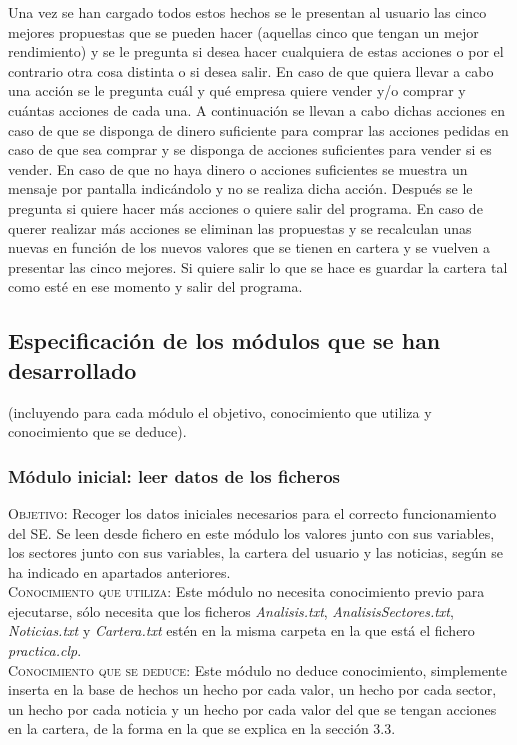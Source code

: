 \documentclass[12pt]{article}
\begin{document}
Una vez se han cargado todos estos hechos se le presentan al usuario las cinco mejores propuestas que se pueden hacer (aquellas cinco que tengan un mejor rendimiento) y se le pregunta si desea hacer cualquiera de estas acciones o por el contrario otra cosa distinta o si desea salir. En caso de que quiera llevar a cabo una acción se le pregunta cuál y qué empresa quiere vender y/o comprar y cuántas acciones de cada una. A continuación se llevan a cabo dichas acciones en caso de que se disponga de dinero suficiente para comprar las acciones pedidas en caso de que sea comprar y se disponga de acciones suficientes para vender si es vender. En caso de que no haya dinero o acciones suficientes se muestra un mensaje por pantalla indicándolo y no se realiza dicha acción. Después se le pregunta si quiere hacer más acciones o quiere salir del programa. En caso de querer realizar más acciones se eliminan las propuestas y se recalculan unas nuevas en función de los nuevos valores que se tienen en cartera y se vuelven a presentar las cinco mejores. Si quiere salir lo que se hace es guardar la cartera tal como esté en ese momento y salir del programa.

\subsection{Especificación de los módulos que se han desarrollado}
(incluyendo para cada módulo el objetivo, conocimiento que utiliza y conocimiento que se deduce).

\subsubsection{Módulo inicial: leer datos de los ficheros}
\textsc{Objetivo}: Recoger los datos iniciales necesarios para el correcto funcionamiento del SE. Se leen desde fichero en este módulo los valores junto con sus variables, los sectores junto con sus variables, la cartera del usuario y las noticias, según se ha indicado en apartados anteriores.\\

\textsc{Conocimiento que utiliza}: Este módulo no necesita conocimiento previo para ejecutarse, sólo necesita que los ficheros \textit{Analisis.txt}, \textit{AnalisisSectores.txt}, \textit{Noticias.txt} y \textit{Cartera.txt} estén en la misma carpeta en la que está el fichero \textit{practica.clp}.\\

\textsc{Conocimiento que se deduce}: Este módulo no deduce conocimiento, simplemente inserta en la base de hechos un hecho por cada valor, un hecho por cada sector, un hecho por cada noticia y un hecho por cada valor del que se tengan acciones en la cartera, de la forma en la que se explica en la sección 3.3.
\end{document}
